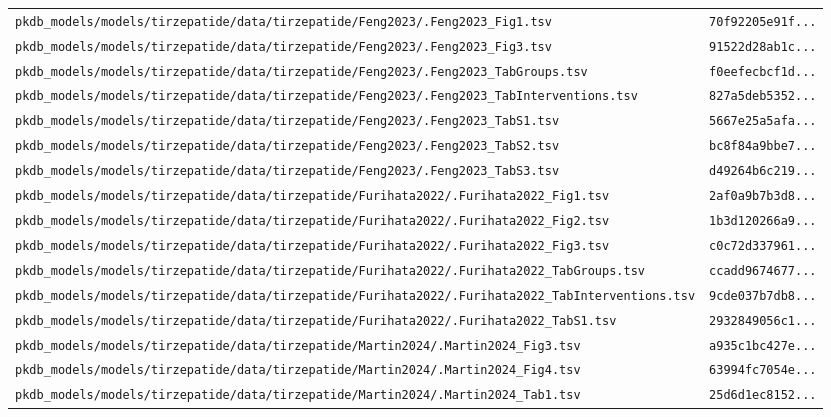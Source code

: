\begin{longtable}{ll}
\texttt{pkdb\_models/models/tirzepatide/data/tirzepatide/Feng2023/.Feng2023\_Fig1.tsv} & \texttt{70f92205e91f...} \\
\texttt{pkdb\_models/models/tirzepatide/data/tirzepatide/Feng2023/.Feng2023\_Fig3.tsv} & \texttt{91522d28ab1c...} \\
\texttt{pkdb\_models/models/tirzepatide/data/tirzepatide/Feng2023/.Feng2023\_TabGroups.tsv} & \texttt{f0eefecbcf1d...} \\
\texttt{pkdb\_models/models/tirzepatide/data/tirzepatide/Feng2023/.Feng2023\_TabInterventions.tsv} & \texttt{827a5deb5352...} \\
\texttt{pkdb\_models/models/tirzepatide/data/tirzepatide/Feng2023/.Feng2023\_TabS1.tsv} & \texttt{5667e25a5afa...} \\
\texttt{pkdb\_models/models/tirzepatide/data/tirzepatide/Feng2023/.Feng2023\_TabS2.tsv} & \texttt{bc8f84a9bbe7...} \\
\texttt{pkdb\_models/models/tirzepatide/data/tirzepatide/Feng2023/.Feng2023\_TabS3.tsv} & \texttt{d49264b6c219...} \\
\texttt{pkdb\_models/models/tirzepatide/data/tirzepatide/Furihata2022/.Furihata2022\_Fig1.tsv} & \texttt{2af0a9b7b3d8...} \\
\texttt{pkdb\_models/models/tirzepatide/data/tirzepatide/Furihata2022/.Furihata2022\_Fig2.tsv} & \texttt{1b3d120266a9...} \\
\texttt{pkdb\_models/models/tirzepatide/data/tirzepatide/Furihata2022/.Furihata2022\_Fig3.tsv} & \texttt{c0c72d337961...} \\
\texttt{pkdb\_models/models/tirzepatide/data/tirzepatide/Furihata2022/.Furihata2022\_TabGroups.tsv} & \texttt{ccadd9674677...} \\
\texttt{pkdb\_models/models/tirzepatide/data/tirzepatide/Furihata2022/.Furihata2022\_TabInterventions.tsv} & \texttt{9cde037b7db8...} \\
\texttt{pkdb\_models/models/tirzepatide/data/tirzepatide/Furihata2022/.Furihata2022\_TabS1.tsv} & \texttt{2932849056c1...} \\
\texttt{pkdb\_models/models/tirzepatide/data/tirzepatide/Martin2024/.Martin2024\_Fig3.tsv} & \texttt{a935c1bc427e...} \\
\texttt{pkdb\_models/models/tirzepatide/data/tirzepatide/Martin2024/.Martin2024\_Fig4.tsv} & \texttt{63994fc7054e...} \\
\texttt{pkdb\_models/models/tirzepatide/data/tirzepatide/Martin2024/.Martin2024\_Tab1.tsv} & \texttt{25d6d1ec8152...} \\

\end{longtable}
